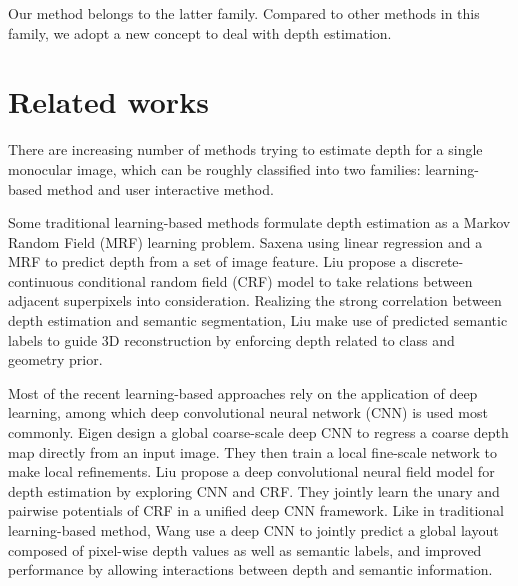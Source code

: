 \documentclass[10pt,twocolumn,letterpaper]{article}
\begin{document}
Our method belongs to the latter family. Compared to other methods in this family, we adopt a new concept to deal with depth estimation.  



\section{Related works}

There are increasing number of methods trying to estimate depth for a single monocular image, which can be roughly classified into two families: learning-based method and user interactive method.

Some traditional learning-based methods formulate depth estimation as a Markov Random Field (MRF) learning problem. Saxena \etal \cite{NIPS2005_2921} using linear regression and a MRF to predict depth from a set of image feature. Liu \etal \cite{Liu_2014_CVPR} propose a discrete-continuous conditional random field (CRF) model to take relations between adjacent superpixels into consideration. Realizing the strong correlation between depth estimation and semantic segmentation, Liu \etal \cite{Liu+al:CVPR10} make use of predicted semantic labels to guide 3D reconstruction by enforcing depth related to class and geometry prior.

Most of the recent learning-based approaches rely on the application of deep learning, among which deep convolutional neural network (CNN) is used most commonly. Eigen \etal \cite{DBLP:journals/corr/EigenPF14} design a global coarse-scale deep CNN to regress a coarse depth map directly from an input image. They then train a local fine-scale network to make local refinements. Liu \etal \cite{Liu_2015_CVPR} propose a deep convolutional neural field model for depth estimation by exploring CNN and  CRF. They jointly learn the unary and pairwise potentials of CRF in a unified deep CNN framework. Like in traditional learning-based method, Wang \etal \cite{Wang_2015_CVPR} use a deep CNN to jointly predict a global layout composed of pixel-wise depth values as well as semantic labels, and improved performance by allowing interactions between depth and semantic information. 
\end{document}
